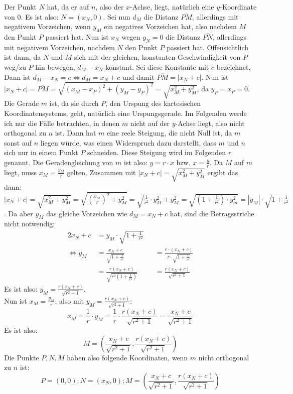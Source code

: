 Der Punkt $N$ hat, da er auf $n$, also der $x$-Achse, liegt, natürlich eine $y$-Koordinate von 0. Es ist also: 
$N=(x_N, 0)$. Sei nun $d_M$ die Distanz $\overline{PM}$, allerdings mit negativem Vorzeichen, wenn $y_M$ ein 
negatives Vorzeichen hat, also nachdem $M$ den Punkt $P$ passiert hat. Nun ist $x_N$ wegen $y_N=0$ die Distanz 
$\overline{PN}$, allerdings mit negativem Vorzeichen, nachdem $N$ den Punkt $P$ passiert hat. Offensichtlich ist 
dann, da $N$ und $M$ sich mit der gleichen, konstanten Geschwindigkeit von $P$ weg/zu $P$ hin bewegen, $d_M-x_N$ 
konstant. Sei diese Konstante mit $c$ bezeichnet. Dann ist $d_M-x_N=c\Leftrightarrow d_M=x_N+c$ und damit 
$\overline{PM}=|x_N+c|$. Nun ist $|x_N+c|=\overline{PM}=\sqrt{(x_M-x_P)^2+(y_M-y_P)^2}=\sqrt{x_M^2+y_M^2}$, da 
$y_P=x_P=0$. Die Gerade $m$ ist, da sie durch $P$, den Urspung des kartesischen Koordinatensystems, geht, natürlich 
eine Urspungsgerade. Im Folgenden werde ich nur die Fälle betrachten, in denen $m$ nicht auf der $y$-Achse liegt, 
also nicht orthogonal zu $n$ ist. Dann hat $m$ eine reele Steigung, die nicht Null ist, da $m$ sonst auf $n$ liegen 
würde, was einen Widerspruch dazu darstellt, dass $m$ und $n$ sich nur in einem Punkt $P$ schneiden. Diese Steigung 
wird im Folgenden $r$ genannt. Die Geradengleichung von $m$ ist also: $y=r\cdot x$ bzw. $x=\frac{y}{r}$. Da $M$ auf 
$m$ liegt, muss $x_M=\frac{y_M}{r}$ gelten. Zusammen mit $|x_N+c|=\sqrt{x_M^2+y_M^2}$ ergibt das dann: $|x_N+c|
=\sqrt{x_M^2+y_M^2}=\sqrt{(\frac{y_M}{r})^2+y_M^2}=\sqrt{\frac{1}{r^2}\cdot y_M^2+y_M^2}=\sqrt{(1+\frac{1}{r^2})
\cdot y_m^2}=|y_M|\cdot\sqrt{1+\frac{1}{r^2}}$. Da aber $y_M$ das gleiche Vorzeichen wie $d_M=x_N+c$ hat, sind die 
Betragsstriche nicht notwendig:
\begin{alignat*}{2}
    x_N+c&=y_M\cdot\sqrt{1+\frac{1}{r^2}}&&\\
    \Leftrightarrow y_M&=\frac{x_N+c}{\sqrt{1+\frac{1}{r^2}}}&&=\frac{r\cdot (x_N+c)}{r\cdot\sqrt{1+\frac{1}{r^2}}}\\
    &=\frac{r(x_N+c)}{\sqrt{r^2\left(1+\frac{1}{r^2}\right)}}&&=\frac{r(x_N+c)}{\sqrt{r^2+1}}
\end{alignat*}
Es ist also: $y_M=\frac{r(x_N+c)}{\sqrt{r^2+1}}$.\\
Nun ist $x_M=\frac{y_M}{r}$, also mit $y_M=\frac{r(x_N+c)}{\sqrt{r^2+1}}$:
\[
x_M=\frac{1}{r}\cdot y_M=\frac{1}{r}\cdot \frac{r(x_N+c)}{\sqrt{r^2+1}}=\frac{x_N+c}{\sqrt{r^2+1}}
\]
Es ist also:
\[
M=\left( \frac{x_N+c}{\sqrt{r^2+1}} , \frac{r(x_N+c)}{\sqrt{r^2+1}} \right)
\]
Die Punkte $P, N, M$ haben also folgende Koordinaten, wenn $m$ nicht orthogonal zu $n$ ist:
\[
P=(0, 0); N=(x_N, 0); M=\left( \frac{x_N+c}{\sqrt{r^2+1}} , \frac{r(x_N+c)}{\sqrt{r^2+1}} \right)
\]

